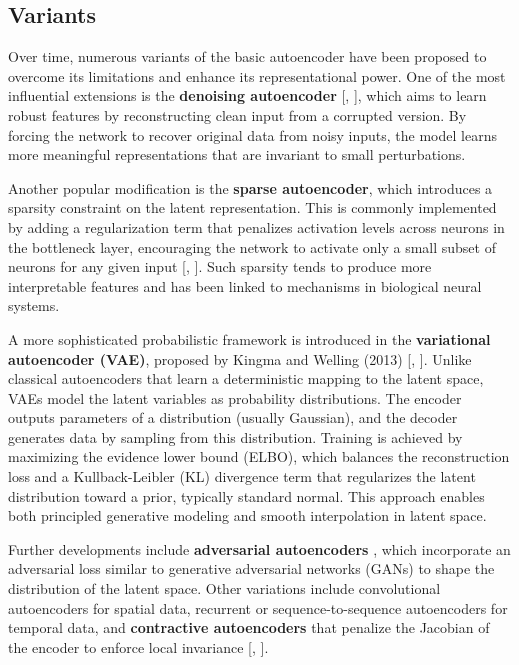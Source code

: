 \subsection{Variants}

Over time, numerous variants of the basic autoencoder have been proposed to overcome its limitations and enhance its representational power. One of the most influential extensions is the \textbf{denoising autoencoder} [\cite{Vincent08}, \cite{Goodfellow16}], which aims to learn robust features by reconstructing clean input from a corrupted version. By forcing the network to recover original data from noisy inputs, the model learns more meaningful representations that are invariant to small perturbations.

Another popular modification is the \textbf{sparse autoencoder}, which introduces a sparsity constraint on the latent representation. This is commonly implemented by adding a regularization term that penalizes activation levels across neurons in the bottleneck layer, encouraging the network to activate only a small subset of neurons for any given input [\cite{Ng11}, \cite{Goodfellow16}]. Such sparsity tends to produce more interpretable features and has been linked to mechanisms in biological neural systems.

A more sophisticated probabilistic framework is introduced in the \textbf{variational autoencoder (VAE)}, proposed by Kingma and Welling (2013) [\cite{Kingma13}, \cite{Bank21}]. Unlike classical autoencoders that learn a deterministic mapping to the latent space, VAEs model the latent variables as probability distributions. The encoder outputs parameters of a distribution (usually Gaussian), and the decoder generates data by sampling from this distribution. Training is achieved by maximizing the evidence lower bound (ELBO), which balances the reconstruction loss and a Kullback-Leibler (KL) divergence term that regularizes the latent distribution toward a prior, typically standard normal. This approach enables both principled generative modeling and smooth interpolation in latent space.

Further developments include \textbf{adversarial autoencoders} \cite{Makhzani16}, which incorporate an adversarial loss similar to generative adversarial networks (GANs) to shape the distribution of the latent space. Other variations include convolutional autoencoders for spatial data, recurrent or sequence-to-sequence autoencoders for temporal data, and \textbf{contractive autoencoders} that penalize the Jacobian of the encoder to enforce local invariance [\cite{Rifai11}, \cite{Goodfellow16}].


